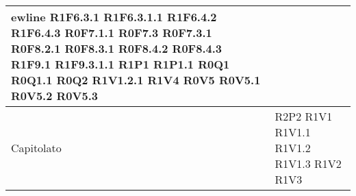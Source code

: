\begin{center}
\begin{longtable}{| p{4cm} | p{4cm} |}
ewline R1F6.3.1 \newline R1F6.3.1.1 \newline R1F6.4.2 \newline R1F6.4.3 \newline R0F7.1.1 \newline R0F7.3 \newline R0F7.3.1 \newline R0F8.2.1 \newline R0F8.3.1 \newline R0F8.4.2 \newline R0F8.4.3 \newline R1F9.1 \newline R1F9.3.1.1 \newline R1P1 \newline R1P1.1 \newline R0Q1 \newline R0Q1.1 \newline R0Q2 \newline R1V1.2.1 \newline R1V4 \newline R0V5 \newline R0V5.1 \newline R0V5.2 \newline R0V5.3 \\
		\hline
		Capitolato  &  R2P2 \newline R1V1 \newline R1V1.1 \newline R1V1.2 \newline R1V1.3 \newline R1V2 \newline R1V3 \\
		\hline


\end{longtable}
\end{center}
